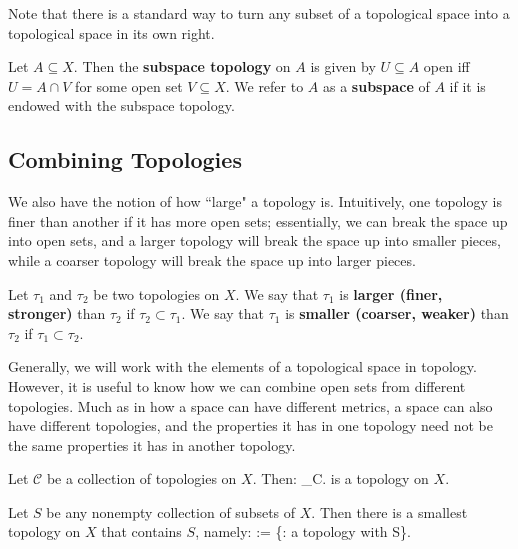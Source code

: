 	Note that there is a standard way to turn any subset of a topological space into a topological space in its own right.
	
	\begin{definition}
		Let $A\subseteq X$. Then the \textbf{subspace topology} on $A$ is given by $U\subseteq A$ open iff $U = A\cap V$ for some open set $V\subseteq X
		$. We refer to $A$ as a \textbf{subspace} of $A$ if it is endowed with the subspace topology.
	\end{definition}
	
	\subsection{Combining Topologies}
	
	We also have the notion of how ``large" a topology is. Intuitively, one topology is finer than another if it has more open sets; essentially, we can break the 
	space up into open sets, and a larger topology will break the space up into smaller pieces, while a coarser topology will break the space up into larger 
	pieces.
	
	\begin{definition}
		Let $\tau_1$ and $\tau_2$ be two topologies on $X$. We say that $\tau_1$ is \textbf{larger (finer, stronger)} than $\tau_2$ if $\tau_2\subset\tau_1$. We say 
		that $\tau_1$ is \textbf{smaller (coarser, weaker)} than $\tau_2$ if $\tau_1\subset\tau_2$.
	\end{definition}
	
	Generally, we will work with the elements of a topological space in topology. However, it is useful to know how we can combine open sets from different 
	topologies. Much as in how a space can have different metrics, a space can also have different topologies, and the properties it has in one topology need 
	not be the same properties it has in another topology.
	
	\begin{prop}
		Let $\mathcal C$ be a collection of topologies on $X$. Then:
		\eq
			\bigcap_{\tau\in\mathcal C}\tau.
		\qe
		is a topology on $X$.
	\end{prop}
	
	\begin{prop}
		Let $S$ be any nonempty collection of subsets of $X$. Then there is a smallest topology on $X$ that contains $S$, namely:
		\eq
			\tau := \bigcap \left\{\tau : \tau\textnormal{ a topology with } S\subseteq\tau \right\}.
		\qe
	\end{prop}
	
